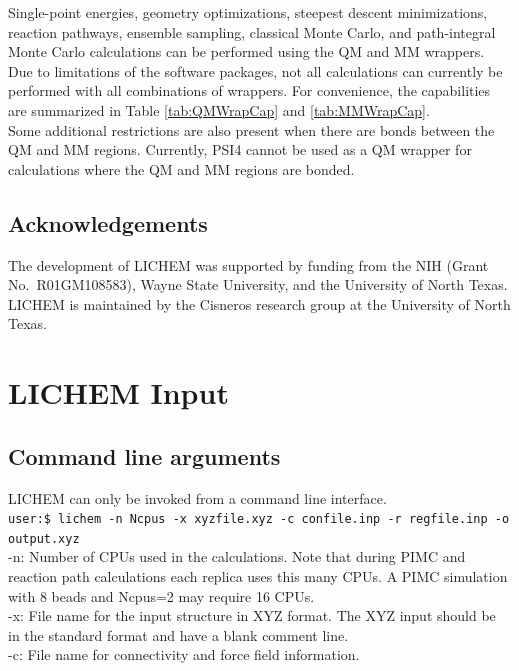 \documentclass[12pt]{report}
\begin{document}
Single-point energies, geometry optimizations, steepest descent minimizations,
reaction pathways, ensemble sampling, classical Monte Carlo, and
path-integral Monte Carlo calculations can be performed using the QM and MM
wrappers.
Due to limitations of the software packages, not all calculations can
currently be performed with all combinations of wrappers.
For convenience, the capabilities are summarized in Table \ref{tab:QMWrapCap}
and \ref{tab:MMWrapCap}. \\

Some additional restrictions are also present when there are bonds between
the QM and MM regions.
Currently, PSI4 cannot be used as a QM wrapper for calculations where the QM
and MM regions are bonded.

\section{Acknowledgements}

The development of LICHEM was supported by funding from the NIH (Grant No.\
R01GM108583), Wayne State University, and the University of North Texas.
LICHEM is maintained by the Cisneros research group at the University of
North Texas.

\chapter{LICHEM Input}

\section{Command line arguments}

LICHEM can only be invoked from a command line interface. \\

\texttt{user:\$ lichem -n Ncpus -x xyzfile.xyz -c confile.inp
-r regfile.inp -o output.xyz} \\

-n: Number of CPUs used in the calculations.
Note that during PIMC and reaction path calculations each replica uses this
many CPUs.
A PIMC simulation with 8 beads and Ncpus=2 may require 16 CPUs. \\

-x: File name for the input structure in XYZ format.
The XYZ input should be in the standard format and have a blank comment
line. \\

-c: File name for connectivity and force field information. \\
\end{document}
